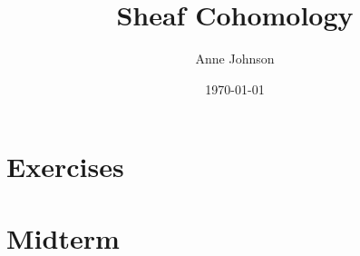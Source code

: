 \documentclass[11pt]{report}
\title{Sheaf Cohomology}
\author{Anne Johnson}
\date{\today}
\theoremstyle{definition}
\begin{document}


\chapter*{Exercises}





\chapter*{Midterm}


%	
\end{document}
